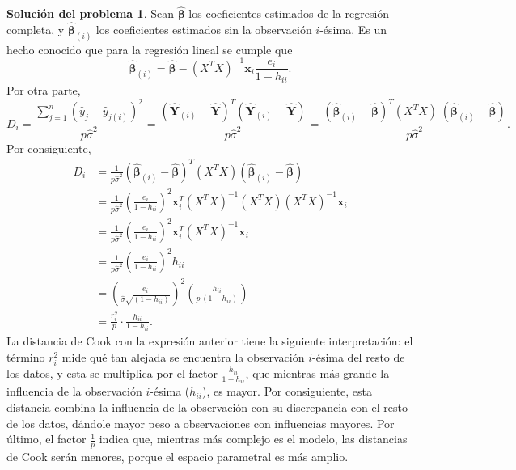 \documentclass[twoside,12pt]{article}
\theoremstyle{definition}
\newtheorem{soln}{Solución del problema}
\begin{document}
\newpage
\begin{soln}
Sean $\hat{\boldsymbol{\beta}}$ los coeficientes estimados de la regresión completa, y $\hat{\boldsymbol{\beta}}_{(i)}$ los coeficientes estimados sin la observación $i$-ésima. Es un hecho conocido que para la regresión lineal se cumple que
\[
\hat{\boldsymbol{\beta}}_{(i)} = \hat{\boldsymbol{\beta}} - {(X^{T} X)}^{-1}\boldsymbol{x}_i \frac{e_i}{1-h_{ii}}.
\]
Por otra parte,
\[
D_i = \frac{\sum_{j=1}^{n} {\left(\hat{y}_j-\hat{y}_{j(i)}\right)}^2}{p\hat{\sigma}^2} =\frac{\left(\widehat{\boldsymbol{Y}}_{(i)}-\widehat{\boldsymbol{Y}}\right)^{T}\left(\widehat{\boldsymbol{Y}}_{(i)}-\widehat{\boldsymbol{Y}}\right)}{p\hat{\sigma}^2} = \frac{(\widehat{\boldsymbol{\beta}}_{(i)}-\widehat{\boldsymbol{\beta}})^{T}(X^{T}X)\; (\widehat{\boldsymbol{\beta}}_{(i)}-\widehat{\boldsymbol{\beta}})}{p\hat{\sigma}^2}.
\]
Por consiguiente,
\[
\begin{split}
  D_i&= \frac{1}{p\hat{\sigma}^2}(\widehat{\boldsymbol{\beta}}_{(i)}-\widehat{\boldsymbol{\beta}})^{T}(X^{T}X)(\widehat{\boldsymbol{\beta}}_{(i)}-\widehat{\boldsymbol{\beta}})\\
  &= \frac{1}{p\hat{\sigma}^2}\left(\frac{e_i}{1-h_{ii}}\right)^2\boldsymbol{x}_i^{T}(X^{T}X)^{-1}(X^{T}X)(X^{T}X)^{-1}\boldsymbol{x}_i\\
  &= \frac{1}{p\hat{\sigma}^2}\left(\frac{e_i}{1-h_{ii}}\right)^2\boldsymbol{x}_i^{T}(X^{T}X)^{-1}\boldsymbol{x}_i\\
  &= \frac{1}{p\hat{\sigma}^2}\left(\frac{e_i}{1-h_{ii}}\right)^2h_{ii}\\
  &= \left( \frac{e_i}{\hat{\sigma}\sqrt{(1-h_{ii})}} \right)^2\left(\frac{h_{ii}}{p\,(1-h_{ii})}\right)\\
  &= \frac{r_i^2}{p} \cdot \frac{h_{ii}}{1-h_{ii}}.
\end{split}
\]
La distancia de Cook con la expresión anterior tiene la siguiente interpretación: el término $r_i^2$ mide qué tan alejada se encuentra la observación $i$-ésima del resto de los datos, y esta se multiplica por el factor $\frac{h_{ii}}{1-h_{ii}}$, que mientras más grande la influencia de la observación $i$-ésima ($h_{ii}$), es mayor. Por consiguiente, esta distancia combina la influencia de la observación con su discrepancia con el resto de los datos, dándole mayor peso a observaciones con influencias mayores. Por último, el factor $\frac{1}{p}$ indica que, mientras más complejo es el modelo, las distancias de Cook serán menores, porque el espacio parametral es más amplio.
\end{soln}
\end{document}
